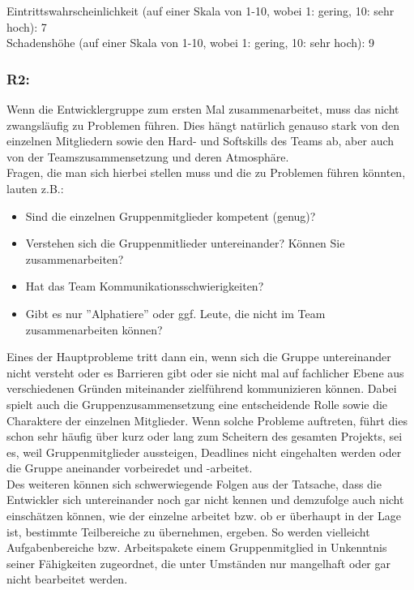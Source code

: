 \documentclass{swp1}
\begin{document}
Eintrittswahrscheinlichkeit (auf einer Skala von 1-10, wobei 1: gering, 10: sehr hoch): 7 \\
Schadenshöhe (auf einer Skala von 1-10, wobei 1: gering, 10: sehr hoch): 9

\subsubsection*{R2:}
Wenn die Entwicklergruppe zum ersten Mal zusammenarbeitet, muss das nicht zwangsläufig zu Problemen führen. Dies hängt natürlich genauso stark von den einzelnen Mitgliedern sowie den Hard- und Softskills des Teams ab, aber auch von der Teamszusammensetzung und deren Atmosphäre. \\
Fragen, die man sich hierbei stellen muss und die zu Problemen führen könnten, lauten z.B.: \\
\begin{itemize}
\item Sind die einzelnen Gruppenmitglieder kompetent (genug)?
\item Verstehen sich die Gruppenmitlieder untereinander? Können Sie zusammenarbeiten?
\item Hat das Team Kommunikationsschwierigkeiten?
\item Gibt es nur ''Alphatiere'' oder ggf. Leute, die nicht im Team zusammenarbeiten können?
\end{itemize}
Eines der Hauptprobleme tritt dann ein, wenn sich die Gruppe untereinander nicht versteht oder es Barrieren gibt oder sie nicht mal auf fachlicher Ebene aus verschiedenen Gründen miteinander zielführend kommunizieren können. Dabei spielt auch die Gruppenzusammensetzung eine entscheidende Rolle sowie die Charaktere der einzelnen Mitglieder. Wenn solche Probleme auftreten, führt dies schon sehr häufig über kurz oder lang zum Scheitern des gesamten Projekts, sei es, weil Gruppenmitglieder aussteigen, Deadlines nicht eingehalten werden oder die Gruppe aneinander vorbeiredet und -arbeitet. \\
Des weiteren können sich schwerwiegende Folgen aus der Tatsache, dass die Entwickler sich untereinander noch gar nicht kennen und demzufolge auch nicht einschätzen können, wie der einzelne arbeitet bzw. ob er überhaupt in der Lage ist, bestimmte Teilbereiche zu übernehmen, ergeben. So werden vielleicht Aufgabenbereiche bzw. Arbeitspakete einem Gruppenmitglied in Unkenntnis seiner Fähigkeiten zugeordnet, die unter Umständen nur mangelhaft oder gar nicht bearbeitet werden.\\
\end{document}
